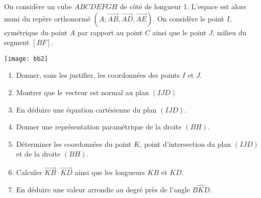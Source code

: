 \documentclass[11pt,fleqn, openany]{book} %
\begin{document}
\begin{exercise}[topic=geom16]
On considère un cube $ABCDEFGH$ de côté de longueur 1. L'espace est alors muni du repère orthonormé $(A;\overrightarrow{AB},\overrightarrow{AD},\overrightarrow{AE})$.
On considère le point $I$, symétrique du point $A$ par rapport au point $C$ ainsi que le point $J$, milieu du segment $[BF]$.

\begin{center}\texttt{[image: bb2]}\end{center}

\begin{enumerate}
    \item Donner, sans les justifier, les coordonnées des points $I$ et $J$.
    \item Montrer que le vecteur  est normal au plan $(IJD)$
    \item En déduire une équation cartésienne du plan $(IJD)$.
    \item Donner une représentation paramétrique de la droite $(BH)$.
    \item Déterminer les coordonnées du point $K$, point d'intersection du plan $(IJD)$ et de la droite $(BH)$.
    \item Calculer $\overrightarrow{KB}\cdot \overrightarrow{KD}$ ainsi que les longueurs $KB$ et $KD$.
    \item En déduire une valeur arrondie au degré près de l'angle $\widehat{BKD}$.
\end{enumerate}
\newpage
\end{exercise}
\end{document}
